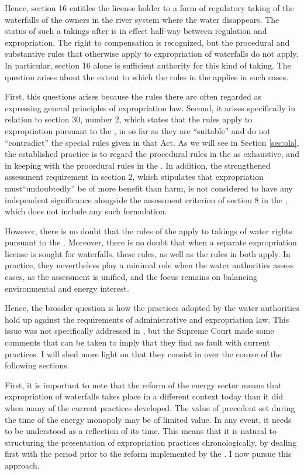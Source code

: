 Hence, section 16 \cite{wra17} entitles the license holder to a form of regulatory taking of the waterfalls of the owners in the river system where the water disappears. The status of such a takings after \cite{måland11} is in effect half-way between regulation and expropriation. The right to compensation is recognized, but the procedural and substantive rules that otherwise apply to expropriation of waterfalls do not apply. In particular, section 16 alone is sufficient authority for this kind of taking. The question arises about the extent to which the rules in the \cite{ea59} applies in such cases. 

First, this questions arises because the rules there are often regarded as expressing general principles of expropriation law. Second, it arises specifically in relation to section 30, number 2, which states that the rules apply to expropriation pursuant to the \cite{wra17}, in so far as they are ``suitable'' and do not ``contradict'' the special rules given in that Act. As we will see in Section \ref{sec:ola}, the established practice is to regard the procedural rules in the \cite{wra17} as exhaustive, and in keeping with the procedural rules in the \cite{ea59}. In addition, the strengthened assessment requirement in section 2, which stipulates that expropriation must``undoubtedly'' be of more benefit than harm, is not considered to have any independent significance alongside the assessment criterion of section 8 in the \cite{wra17}, which does not include any such formulation.

However, there is no doubt that the rules of the \cite{paa67} apply to takings of water rights pursuant to the \cite{wra17}. Moreover, there is no doubt that when a separate expropriation license is sought for waterfalls, these rules, as well as the rules in \cite{ea59} both apply. In practice, they nevertheless play a minimal role when the water authorities assess cases, as the assessment is unified, and the focus remains on balancing environmental and energy interest.

Hence, the broader question is how the practices adopted by the water authorities hold up against the requirements of administrative and expropriation law. This issue was not specifically addressed in \cite{måland11}, but the Supreme Court made some comments that can be taken to imply that they find no fault with current practices. I will shed more light on that they consist in over the course of the following sections. 

First, it is important to note that the reform of the energy sector means that expropriation of waterfalls takes place in a different context today than it did when many of the current practices developed. The value of precedent set during the time of the energy monopoly may be of limited value. In any event, it needs to be understood as a reflection of its time. This means that it is natural to structuring the presentation of expropriation practices chronologically, by dealing first with the period prior to the reform implemented by the \cite{ea90}. I now pursue this approach.

